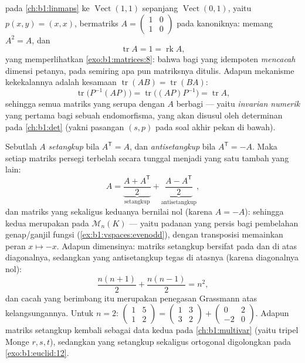 \begin{example}
\label{ex:b1:matrices:tracework}
 pada \cref{ch:b1:linmaps} ke
$\operatorname{Vect}(1,1)$ sepanjang $\operatorname{Vect}(0,1)$,
yaitu $p(x, y) = (x, x)$, bermatriks $A = \begin{pmatrix} 1 & 0\\ 1 &
0\end{pmatrix}$ pada  kanoniknya: memang $A^2 = A$, dan
\[
\operatorname{tr} A = 1 = \operatorname{rk} A ,
\]
yang memperlihatkan \cref{exo:b1:matrices:8}: bahwa bagi yang idempoten 
\emph{mencacah} dimensi petanya, pada  semiring apa pun
matriksnya ditulis. Adapun mekanisme kekekalannya adalah
kesamaan $\operatorname{tr}(AB) = \operatorname{tr}(BA)$:
\[
\operatorname{tr}\bigl(P^{-1}(AP)\bigr) =
\operatorname{tr}\bigl((AP)P^{-1}\bigr) = \operatorname{tr} A ,
\]
sehingga semua matriks yang serupa dengan $A$ berbagi  --- yaitu
\emph{invarian numerik} yang pertama bagi sebuah endomorfisma, yang akan disusul
oleh determinan pada \cref{ch:b1:det} (yakni pasangan $(s, p)$ pada
soal akhir pekan di bawah).
\end{example}

\begin{example}
\label{ex:b1:matrices:symsplit}
Sebutlah $A$ \emph{setangkup} bila $A^{\mathsf T} = A$, dan
\emph{antisetangkup} bila $A^{\mathsf T} = -A$. Maka setiap matriks
persegi terbelah secara tunggal menjadi yang satu tambah yang lain:
\[
A = \underbrace{\frac{A + A^{\mathsf T}}{2}}_{\text{setangkup}}
+ \underbrace{\frac{A - A^{\mathsf T}}{2}}_{\text{antisetangkup}},
\]
dan matriks yang sekaligus keduanya bernilai nol (karena $A = -A$): sehingga kedua 
merupakan  pada $\mathcal{M}_n(K)$ --- yaitu
padanan yang persis bagi pembelahan genap/ganjil fungsi
(\cref{ex:b1:vspaces:evenodd}), dengan transposisi memainkan
peran $x \mapsto -x$. Adapun dimensinya: matriks setangkup bersifat 
pada dan di atas diagonalnya, sedangkan yang antisetangkup tegas di atasnya
(karena diagonalnya nol):
\[
\frac{n(n+1)}{2} + \frac{n(n-1)}{2} = n^2 ,
\]
dan cacah yang berimbang itu merupakan penegasan Grassmann atas
kelangsungannya. Untuk $n = 2$: $\begin{pmatrix} 1 & 5\\ 1 &
2\end{pmatrix} = \begin{pmatrix} 1 & 3\\ 3 & 2\end{pmatrix} +
\begin{pmatrix} 0 & 2\\ -2 & 0\end{pmatrix}$. Adapun matriks
setangkup kembali sebagai data  kedua pada
\cref{ch:b1:multivar} (yaitu tripel Monge $r, s, t$), sedangkan
yang setangkup sekaligus ortogonal digolongkan pada
\cref{exo:b1:euclid:12}.
\end{example}

